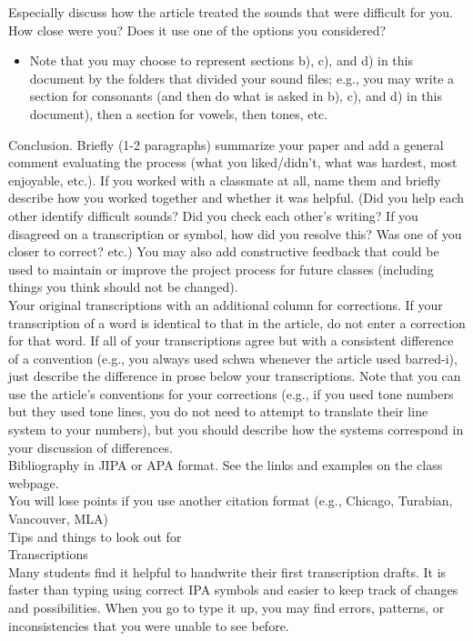 \documentclass[12pt]{article}
\begin{document}
Especially discuss how the article treated the sounds that were difficult for you.  How close were you?  Does it use one of the options you considered?\\
\begin{itemize}
\item Note that you may choose to represent sections b), c), and d) in this document by the folders that divided your sound files; e.g., you may write a section for consonants (and then do what is asked in b), c), and d) in this document), then a section for vowels, then tones, etc.
\end{itemize}
Conclusion.  Briefly (1-2 paragraphs) summarize your paper and add a general comment evaluating the process (what you liked/didn’t, what was hardest, most enjoyable, etc.).   If you worked with a classmate at all, name them and briefly describe how you worked together and whether it was helpful.  (Did you help each other identify difficult sounds?  Did you check each other’s writing?  If you disagreed on a transcription or symbol, how did you resolve this?  Was one of you closer to correct? etc.)  You may also add constructive feedback that could be used to maintain or improve the project process for future classes (including things you think should not be changed).\\
Your original transcriptions with an additional column for corrections.  If your transcription of a word is identical to that in the article, do not enter a correction for that word.  If all of your transcriptions agree but with a consistent difference of a convention (e.g., you always used schwa whenever the article used barred-i), just describe the difference in prose below your transcriptions.  Note that you can use the article’s conventions for your corrections (e.g., if you used tone numbers but they used tone lines, you do not need to attempt to translate their line system to your numbers), but you should describe how the systems correspond in your discussion of differences.\\
Bibliography in JIPA or APA format.  See the links and examples on the class webpage.\\
You will lose points if you use another citation format (e.g., Chicago, Turabian, Vancouver, MLA)\\
Tips and things to look out for\\
Transcriptions\\
Many students find it helpful to handwrite their first transcription drafts.  It is faster than typing using correct IPA symbols and easier to keep track of changes and possibilities.  When you go to type it up, you may find errors, patterns, or inconsistencies that you were unable to see before.\\
\end{document}
